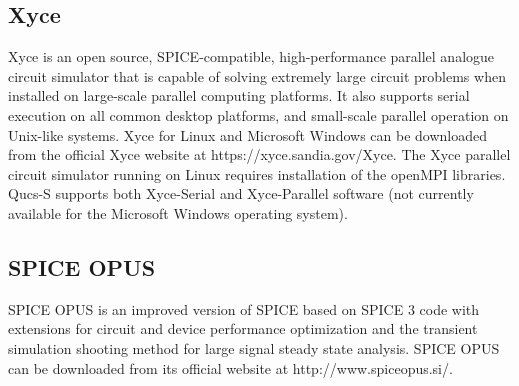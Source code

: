 \documentclass[10pt, a4paper]{report}
\begin{document}
\subsection{Xyce}
Xyce is an open source, SPICE-compatible, high-performance parallel analogue circuit simulator that is capable of solving extremely large circuit problems when installed on large-scale parallel computing platforms.  It also supports serial execution on all common desktop platforms, and small-scale parallel operation on Unix-like systems. 
Xyce for Linux and Microsoft Windows can be downloaded from the official Xyce website at https://xyce.sandia.gov/Xyce.
The Xyce parallel circuit simulator running on Linux requires installation of the openMPI libraries.  Qucs-S supports both Xyce-Serial and Xyce-Parallel software (not currently available for the Microsoft Windows operating system). 
\subsection{SPICE OPUS}
SPICE OPUS is an improved version of SPICE based on SPICE 3 code with extensions for circuit and device performance optimization and the transient simulation shooting method for large signal steady state analysis.  SPICE OPUS can be downloaded from its official website at http://www.spiceopus.si/.
\end{document}
